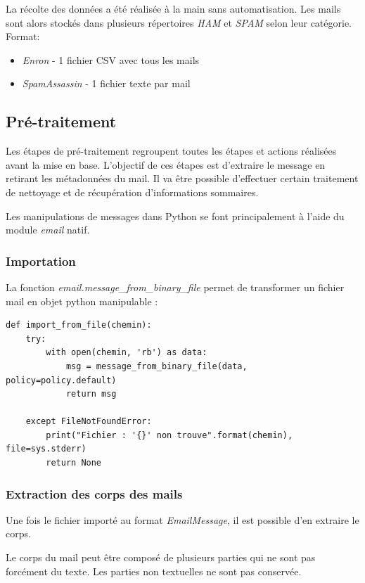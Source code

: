 \documentclass[a4paper,12pt]{article}
\begin{document}
			La récolte des données a été réalisée à la main sans automatisation. 
			Les mails sont alors stockés dans plusieurs répertoires \emph{HAM} et \emph{SPAM} selon leur catégorie. \\
			
			Format:
			\begin{itemize}
				\item \emph{Enron} - 1 fichier CSV avec tous les mails
				\item \emph{SpamAssassin} - 1 fichier texte par mail
			\end{itemize}
	
	\subsection{Pré-traitement}
		Les étapes de pré-traitement regroupent toutes les étapes et actions réalisées avant la mise en base. 
		L'objectif de ces étapes est d'extraire le message en retirant les métadonnées du mail.
		Il va être possible d'effectuer certain traitement de nettoyage et de récupération d'informations sommaires.
		
		Les manipulations de messages dans Python se font principalement à l'aide du module \emph{email} natif. 
		
		\subsubsection{Importation}		
			La fonction \emph{email.message\_from\_binary\_file} permet de transformer un fichier mail en objet python manipulable :
			\begin{lstlisting}[title=Fonction d'importation des fichiers]
def import_from_file(chemin):
    try:
        with open(chemin, 'rb') as data:
            msg = message_from_binary_file(data, policy=policy.default)
            return msg
	
    except FileNotFoundError:
        print("Fichier : '{}' non trouve".format(chemin), file=sys.stderr)
        return None\end{lstlisting}
		
		
		\subsubsection{Extraction des corps des mails}
			Une fois le fichier importé au format \emph{EmailMessage}, il est possible d'en extraire le corps.
			
			Le corps du mail peut être composé de plusieurs parties qui ne sont pas forcément du texte. Les parties non textuelles ne sont pas conservée. 
					
\end{document}
